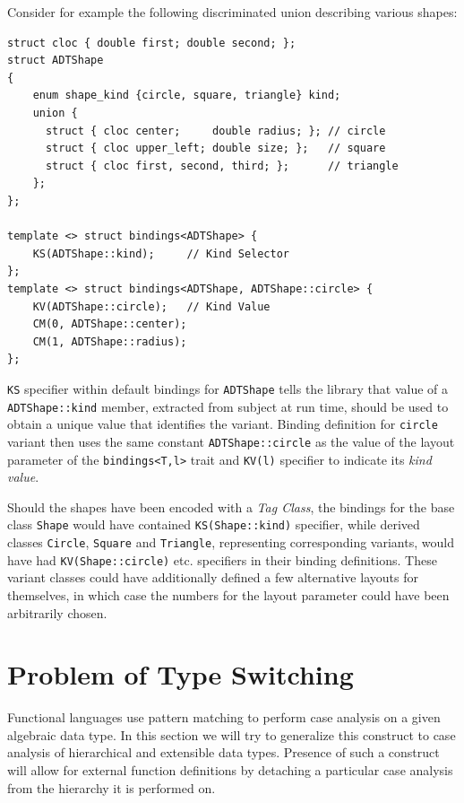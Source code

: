 \documentclass[preprint]{sigplanconf}
\makeatletter
\DeclareRobustCommand{\code}[1]{{\lstinline[breaklines=false,escapechar=@]{#1}}}
\makeatother
\begin{document}
Consider for example the following discriminated union describing various 
shapes:

\begin{lstlisting}[keepspaces,columns=flexible]
struct cloc { double first; double second; };
struct ADTShape
{
    enum shape_kind {circle, square, triangle} kind;
    union {
      struct { cloc center;     double radius; }; // circle
      struct { cloc upper_left; double size; };   // square
      struct { cloc first, second, third; };      // triangle
    };
};

template <> struct bindings<ADTShape> { 
    KS(ADTShape::kind);     // Kind Selector
};
template <> struct bindings<ADTShape, ADTShape::circle> {
    KV(ADTShape::circle);   // Kind Value
    CM(0, ADTShape::center);
    CM(1, ADTShape::radius);
};
\end{lstlisting}

\noindent
\code{KS} specifier within default bindings for \code{ADTShape} tells the library 
that value of a \code{ADTShape::kind} member, extracted from subject at run time, 
should be used to obtain a unique value that identifies the variant. Binding 
definition for \code{circle} variant then uses the same constant 
\code{ADTShape::circle} as the value of the layout parameter of the 
\code{bindings<T,l>} trait and \code{KV(l)} specifier to indicate its \emph{kind 
value}.

Should the shapes have been encoded with a \emph{Tag Class}, the bindings for 
the base class \code{Shape} would have contained \code{KS(Shape::kind)} 
specifier, while derived classes \code{Circle}, \code{Square} and 
\code{Triangle}, representing corresponding variants, would have had 
\code{KV(Shape::circle)} etc. specifiers in their binding definitions. These 
variant classes could have additionally defined a few alternative layouts for 
themselves, in which case the numbers for the layout parameter could have been 
arbitrarily chosen.

\section{Problem of Type Switching} %
\label{sec:impl}

Functional languages use pattern matching to perform case analysis on a given 
algebraic data type. In this section we will try to generalize this construct to 
case analysis of hierarchical and extensible data types. Presence of such a
construct will allow for external function definitions by detaching a particular 
case analysis from the hierarchy it is performed on.
\end{document}

